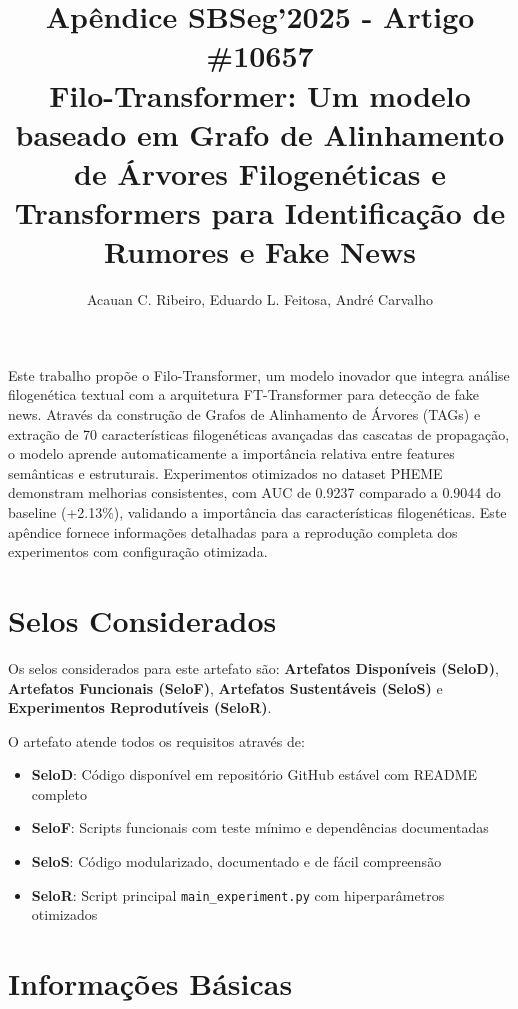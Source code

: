 \documentclass[12pt]{article}
\title{Ap\^endice SBSeg'2025 - Artigo \#10657\\
\large Filo-Transformer: Um modelo baseado em Grafo de Alinhamento de \'Arvores Filogen\'eticas e Transformers para Identifica\c{c}\~ao de Rumores e Fake News}
\author{Acauan C. Ribeiro\inst{1,2}, Eduardo L. Feitosa\inst{1}, Andr\'e Carvalho\inst{1}}
\begin{document}
 

\maketitle

\begin{resumo} 
Este trabalho prop\~oe o Filo-Transformer, um modelo inovador que integra an\'alise filogen\'etica textual com a arquitetura FT-Transformer para detec\c{c}\~ao de fake news. Atrav\'es da constru\c{c}\~ao de Grafos de Alinhamento de \'Arvores (TAGs) e extra\c{c}\~ao de 70 caracter\'isticas filogen\'eticas avan\c{c}adas das cascatas de propaga\c{c}\~ao, o modelo aprende automaticamente a import\^ancia relativa entre features sem\^anticas e estruturais. Experimentos otimizados no dataset PHEME demonstram melhorias consistentes, com AUC de 0.9237 comparado a 0.9044 do baseline (+2.13\%), validando a import\^ancia das caracter\'isticas filogen\'eticas. Este ap\^endice fornece informa\c{c}\~oes detalhadas para a reprodu\c{c}\~ao completa dos experimentos com configura\c{c}\~ao otimizada.
\end{resumo}

\section{Selos Considerados}

Os selos considerados para este artefato s\~ao: \textbf{Artefatos Dispon\'iveis (SeloD)}, \textbf{Artefatos Funcionais (SeloF)}, \textbf{Artefatos Sustent\'aveis (SeloS)} e \textbf{Experimentos Reprodut\'iveis (SeloR)}.

O artefato atende todos os requisitos atrav\'es de:
\begin{itemize}
    \item \textbf{SeloD}: C\'odigo dispon\'ivel em reposit\'orio GitHub est\'avel com README completo
    \item \textbf{SeloF}: Scripts funcionais com teste m\'inimo e depend\^encias documentadas
    \item \textbf{SeloS}: C\'odigo modularizado, documentado e de f\'acil compreens\~ao
    \item \textbf{SeloR}: Script principal \texttt{main\_experiment.py} com hiperpar\^ametros otimizados
\end{itemize}

\section{Informa\c{c}\~oes B\'asicas}
\end{document}
